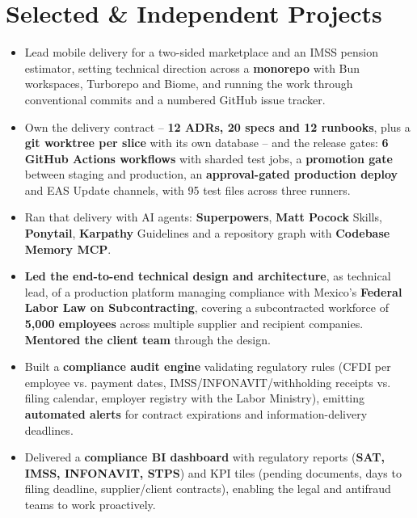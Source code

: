 {\section*{Selected \& Independent Projects}

\begin{itemize}
    \item Lead mobile delivery for a two-sided marketplace and an IMSS pension estimator, setting technical direction across a \textbf{monorepo} with Bun workspaces, Turborepo and Biome, and running the work through conventional commits and a numbered GitHub issue tracker.
    \item Own the delivery contract -- \textbf{12 ADRs, 20 specs and 12 runbooks}, plus a \textbf{git worktree per slice} with its own database -- and the release gates: \textbf{6 GitHub Actions workflows} with sharded test jobs, a \textbf{promotion gate} between staging and production, an \textbf{approval-gated production deploy} and EAS Update channels, with 95 test files across three runners.
    \item Ran that delivery with AI agents: \textbf{Superpowers}, \textbf{Matt Pocock} Skills, \textbf{Ponytail}, \textbf{Karpathy} Guidelines and a repository graph with \textbf{Codebase Memory MCP}.
\end{itemize}

\begin{itemize}
    \item \textbf{Led the end-to-end technical design and architecture}, as technical lead, of a production platform managing compliance with Mexico's \textbf{Federal Labor Law on Subcontracting}, covering a subcontracted workforce of \textbf{5{,}000 employees} across multiple supplier and recipient companies. \textbf{Mentored the client team} through the design.
    \item Built a \textbf{compliance audit engine} validating regulatory rules (CFDI per employee vs. payment dates, IMSS/INFONAVIT/withholding receipts vs. filing calendar, employer registry with the Labor Ministry), emitting \textbf{automated alerts} for contract expirations and information-delivery deadlines.
    \item Delivered a \textbf{compliance BI dashboard} with regulatory reports (\textbf{SAT, IMSS, INFONAVIT, STPS}) and KPI tiles (pending documents, days to filing deadline, supplier/client contracts), enabling the legal and antifraud teams to work proactively.
\end{itemize}
}

